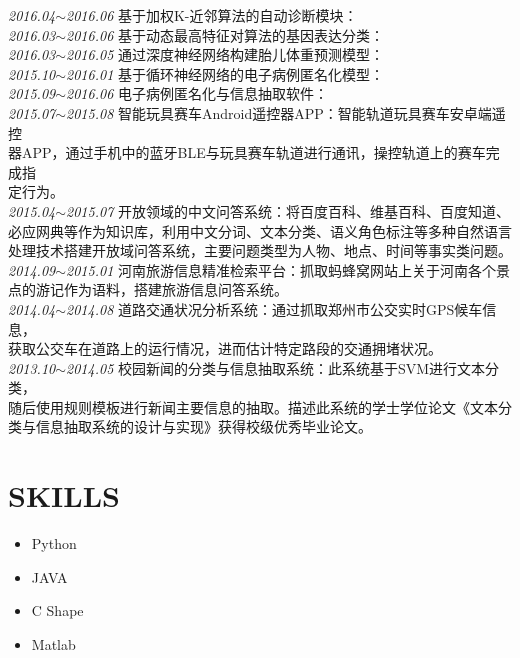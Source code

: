 \documentclass[line, margin]{res}
\begin{document}
\begin{resume}
 { 
 {\sl 2016.04$\sim$2016.06} 基于加权K-近邻算法的自动诊断模块：{ } \\
[5pt] 
 {\sl 2016.03$\sim$2016.06} 基于动态最高特征对算法的基因表达分类：{ }\\
[5pt] 
 {\sl 2016.03$\sim$2016.05} 通过深度神经网络构建胎儿体重预测模型：{ }\\
[5pt]
 {\sl 2015.10$\sim$2016.01} 基于循环神经网络的电子病例匿名化模型：{ } \\
[5pt] 
 {\sl 2015.09$\sim$2016.06} 电子病例匿名化与信息抽取软件：{ }\\
[5pt]
 {\sl 2015.07$\sim$2015.08} 智能玩具赛车Android遥控器APP：{ 智能轨道玩具赛车安卓端遥控\\
 器APP，通过手机中的蓝牙BLE与玩具赛车轨道进行通讯，操控轨道上的赛车完成指\\
 定行为。}\\
[5pt]
 {\sl 2015.04$\sim$2015.07} 开放领域的中文问答系统：{ 将百度百科、维基百科、百度知道、\\
 必应网典等作为知识库，利用中文分词、文本分类、语义角色标注等多种自然语言\\
 处理技术搭建开放域问答系统，主要问题类型为人物、地点、时间等事实类问题。}\\ 
[5pt]
 {\sl 2014.09$\sim$2015.01} 河南旅游信息精准检索平台：{ 抓取蚂蜂窝网站上关于河南各个景\\
 点的游记作为语料，搭建旅游信息问答系统。} \\
[5pt]
 {\sl 2014.04$\sim$2014.08} 道路交通状况分析系统：{ 通过抓取郑州市公交实时GPS候车信息，\\
 获取公交车在道路上的运行情况，进而估计特定路段的交通拥堵状况。} \\
[5pt]
 {\sl 2013.10$\sim$2014.05} 校园新闻的分类与信息抽取系统：{ 此系统基于SVM进行文本分类，\\
 随后使用规则模板进行新闻主要信息的抽取。描述此系统的学士学位论文《文本分\\
 类与信息抽取系统的设计与实现》获得校级优秀毕业论文。}} \\
 
\section{SKILLS}
\begin{itemize}
\item Python
\item JAVA
\item C Shape
\item Matlab
\end{itemize}

\end{resume}
\end{document}
